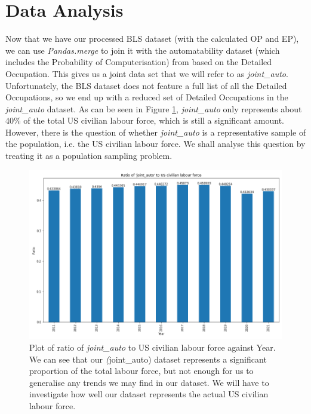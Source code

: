 \documentclass[11pt]{article}
\begin{document}
\clearpage

\section{Data Analysis}

Now that we have our processed BLS dataset (with the calculated OP and EP), we can use \emph{Pandas.merge} to join it with the automatability dataset (which includes the Probability of Computerisation) from \cite{futureofemployment} based on the Detailed Occupation. This gives us a joint data set that we will refer to as \emph{joint\_auto}. Unfortunately, the BLS dataset does not feature a full list of all the Detailed Occupations, so we end up with a reduced set of Detailed Occupations in the \emph{joint\_auto} dataset. As can be seen in Figure \ref{fig:jointautoratio}, \emph{joint\_auto} only represents about 40\% of the total US civilian labour force, which is still a significant amount. However, there is the question of whether \emph{joint\_auto} is a representative sample of the population, i.e. the US civilian labour force. We shall analyse this question by treating it as a population sampling problem.

\begin{figure}[!htb]
	\centering
	\includegraphics[width=12cm]{Figures/joint_auto ratio.png}
	\caption{Plot of ratio of \emph{joint\_auto} to US civilian labour force against Year. We can see that our \emph(joint\_auto) dataset represents a significant proportion of the total labour force, but not enough for us to generalise any trends we may find in our dataset. We will have to investigate how well our dataset represents the actual US civilian labour force.}
	\label{fig:jointautoratio}
\end{figure}
\end{document}
